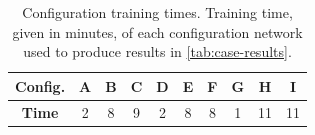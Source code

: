 \begin{table}[h!]
\begin{center}
\begin{tabular}{|c|c|c|c|c|c|c|c|c|c|}
\hline
\textbf{Config.} & A & B & C & D & E & F & G & H & I \\ \hline
\textbf{Time} & 2 & 8 & 9 & 2 & 8 & 8 & 1 & 11 & 11 \\ \hline
\end{tabular}
\end{center}
\caption[Configuration training times]{Configuration training times. Training time, given in minutes, of each configuration network used to produce results in \autoref{tab:case-results}.}
\label{tab:train-times}
\end{table}


\cleardoublepage